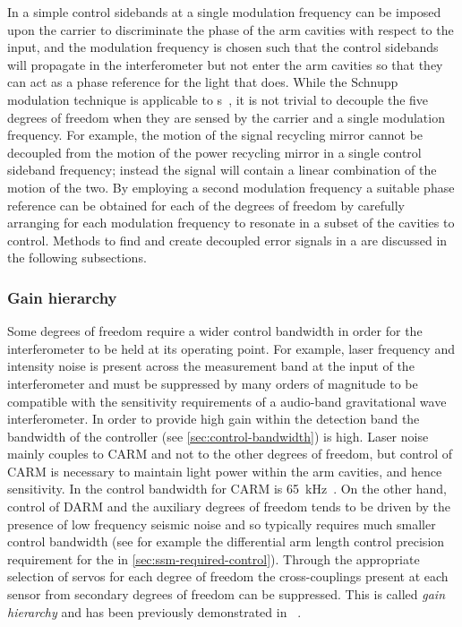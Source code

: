 In a simple \MI{} control sidebands at a single modulation frequency can be imposed upon the carrier to discriminate the phase of the arm cavities with respect to the input, and the modulation frequency is chosen such that the control sidebands will propagate in the interferometer but not enter the arm cavities so that they can act as a phase reference for the light that does. While the Schnupp modulation technique is applicable to \DRFPMI{}s~\cite{Heinzel1998}, it is not trivial to decouple the five degrees of freedom when they are sensed by the carrier and a single modulation frequency. For example, the motion of the signal recycling mirror cannot be decoupled from the motion of the power recycling mirror in a single control sideband frequency; instead the signal will contain a linear combination of the motion of the two. By employing a second modulation frequency a suitable phase reference can be obtained for each of the degrees of freedom by carefully arranging for each modulation frequency to resonate in a subset of the cavities to control. Methods to find and create decoupled error signals in a \DRFPMI{} are discussed in the following subsections.

\subsubsection{\label{sec:drfpmi-gain-hierarchy}Gain hierarchy}
Some degrees of freedom require a wider control bandwidth in order for the interferometer to be held at its operating point. For example, laser frequency and intensity noise is present across the measurement band at the input of the interferometer and must be suppressed by many orders of magnitude to be compatible with the sensitivity requirements of a audio-band gravitational wave interferometer. In order to provide high gain within the detection band the bandwidth of the controller (see \cref{sec:control-bandwidth}) is high. Laser noise mainly couples to \gls{CARM} and not to the other degrees of freedom, but control of \gls{CARM} is necessary to maintain light power within the arm cavities, and hence sensitivity. In \ALIGO{} the control bandwidth for \gls{CARM} is \SI{65}{\kilo\hertz}~\cite{Abbott2010}. On the other hand, control of \gls{DARM} and the auxiliary degrees of freedom tends to be driven by the presence of low frequency seismic noise and so typically requires much smaller control bandwidth (see for example the differential arm length control precision requirement for the \SSMEXPT{} in \cref{sec:ssm-required-control}). Through the appropriate selection of servos for each degree of freedom the cross-couplings present at each sensor from secondary degrees of freedom can be suppressed. This is called \emph{gain hierarchy} and has been previously demonstrated in \LIGO{}~\cite{Fritschel2001}.

